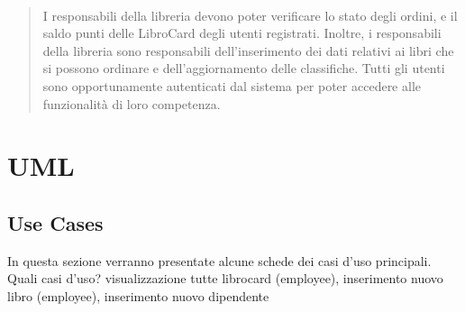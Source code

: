 \documentclass[12pt,a4paper]{article}
\begin{document}
\begin{quotation}
{		\paragraph{}I responsabili della libreria devono poter verificare lo stato degli ordini, e il saldo punti delle LibroCard degli utenti registrati.
		Inoltre, i responsabili della libreria sono responsabili dell’inserimento dei dati relativi ai libri che si possono ordinare e dell’aggiornamento delle classifiche.
		Tutti gli utenti sono opportunamente autenticati dal sistema per poter accedere alle funzionalità di loro competenza.}
	\end{quotation}
	\section{UML}
	\subsection{Use Cases}
	In questa sezione verranno presentate alcune schede dei casi d'uso principali.\\Quali casi d'uso? visualizzazione tutte librocard (employee), inserimento nuovo libro (employee)\vspace{10px}, inserimento nuovo dipendente\\
	\renewcommand{\arraystretch}{2.0}
	\setlength{\tabcolsep}{15pt}
\end{document}
